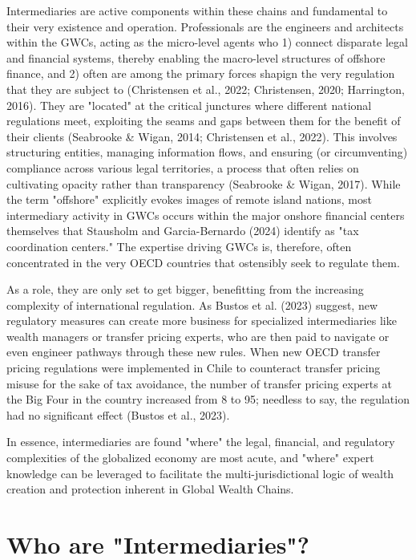 Intermediaries are active components within these chains and fundamental to their very existence and operation. Professionals are the engineers and architects within the GWCs, acting as the micro-level agents who 1) connect disparate legal and financial systems, thereby enabling the macro-level structures of offshore finance, and 2) often are among the primary forces shapign the very regulation that they are subject to (Christensen et al., 2022; Christensen, 2020; Harrington, 2016). They are "located" at the critical junctures where different national regulations meet, exploiting the seams and gaps between them for the benefit of their clients (Seabrooke \& Wigan, 2014; Christensen et al., 2022). This involves structuring entities, managing information flows, and ensuring (or circumventing) compliance across various legal territories, a process that often relies on cultivating opacity rather than transparency (Seabrooke \& Wigan, 2017). While the term "offshore" explicitly evokes images of remote island nations, most intermediary activity in GWCs occurs within the major onshore financial centers themselves that Stausholm and Garcia-Bernardo (2024) identify as "tax coordination centers." The expertise driving GWCs is, therefore, often concentrated in the very OECD countries that ostensibly seek to regulate them. 

As a role, they are only set to get bigger, benefitting from the increasing complexity of international regulation. As Bustos et al. (2023) suggest, new regulatory measures can create more business for specialized intermediaries like wealth managers or transfer pricing experts, who are then paid to navigate or even engineer pathways through these new rules. When new OECD transfer pricing regulations were implemented in Chile to counteract transfer pricing misuse for the sake of tax avoidance, the number of transfer pricing experts at the Big Four in the country increased from 8 to 95; needless to say, the regulation had no significant effect (Bustos et al., 2023).

In essence, intermediaries are found "where" the legal, financial, and regulatory complexities of the globalized economy are most acute, and "where" expert knowledge can be leveraged to facilitate the multi-jurisdictional logic of wealth creation and protection inherent in Global Wealth Chains.

\section{Who are "Intermediaries"?} 

